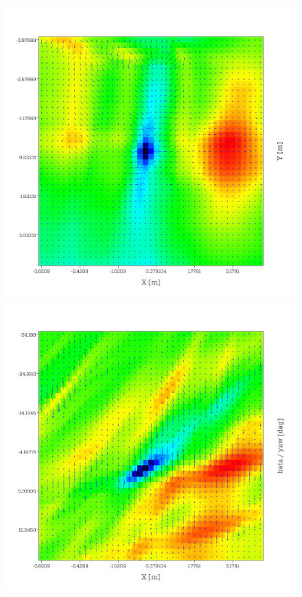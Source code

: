 \begin{figure}
    \begin{minipage}[t]{0.48\textwidth}
        \includegraphics[width = \textwidth]{images/cost_surface/error_xy_4.png}
    \end{minipage}
    \hfill
    \begin{minipage}[t]{0.48\textwidth}
        \includegraphics[width = \textwidth]{images/cost_surface/error_xb_4.png}

\end{minipage}
\end{figure}
